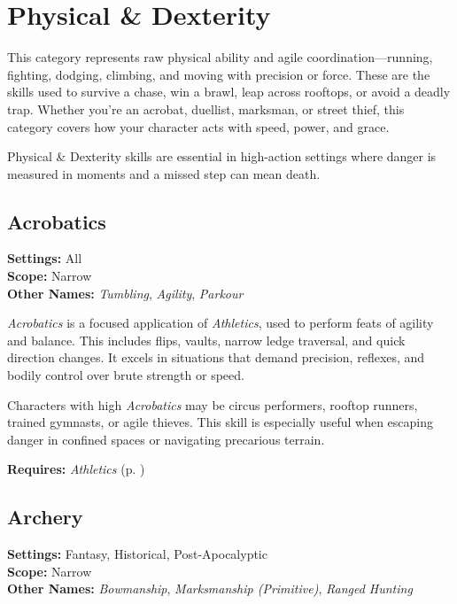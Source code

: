 \section{Physical \& Dexterity}

This category represents raw physical ability and agile coordination—running, fighting, dodging, climbing, and moving with precision or force. These are the skills used to survive a chase, win a brawl, leap across rooftops, or avoid a deadly trap. Whether you're an acrobat, duellist, marksman, or street thief, this category covers how your character acts with speed, power, and grace.

Physical \& Dexterity skills are essential in high-action settings where danger is measured in moments and a missed step can mean death.


\subsection{Acrobatics}\label{skill:acrobatics}
\textbf{Settings:} All\\
\textbf{Scope:} Narrow\\
\textbf{Other Names:} \emph{Tumbling}, \emph{Agility}, \emph{Parkour}\\
\vspace{\baselineskip}

\emph{Acrobatics} is a focused application of \emph{Athletics}, used to perform feats of agility and balance. This includes flips, vaults, narrow ledge traversal, and quick direction changes. It excels in situations that demand precision, reflexes, and bodily control over brute strength or speed.

Characters with high \emph{Acrobatics} may be circus performers, rooftop runners, trained gymnasts, or agile thieves. This skill is especially useful when escaping danger in confined spaces or navigating precarious terrain.

\vspace{0.5\baselineskip}
\noindent\textbf{Requires:} \emph{Athletics} (p. \pageref{skill:athletics})


\subsection{Archery}\label{skill:archery}
\textbf{Settings:} Fantasy, Historical, Post-Apocalyptic\\
\textbf{Scope:} Narrow\\
\textbf{Other Names:} \emph{Bowmanship}, \emph{Marksmanship (Primitive)}, \emph{Ranged Hunting}\\
\vspace{\baselineskip}

